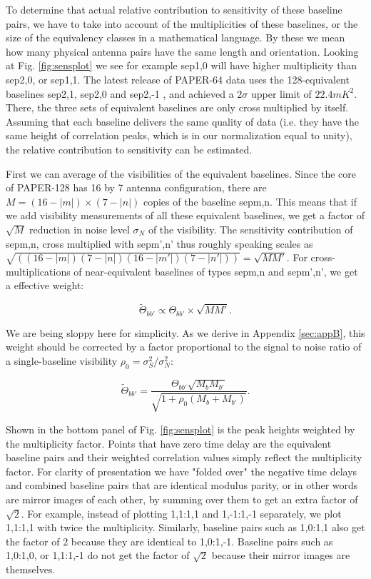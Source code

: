 \documentclass[preprint2,numberedappendix,tighten,twocolappendix]{aastex6}  %
\renewcommand\[{\begin{equation}}
\renewcommand\]{\end{equation}}
\begin{document}
To determine that actual relative contribution to sensitivity of these
baseline pairs, we have to take into account of the multiplicities of
these baselines, or the size of the equivalency classes in a mathematical
language. By these we mean how many physical antenna pairs have the
same length and orientation. Looking at Fig. \ref{fig:sensplot}
we see for example sep1,0 will have higher multiplicity than sep2,0,
or sep1,1. The latest release of PAPER-64 data uses the 128-equivalent baselines sep2,1,
sep2,0 and sep2,-1 \cite{Ali2015}, and achieved a $2\sigma$ upper
limit of $22.4mK^{2}$. There, the three sets of equivalent baselines
are only cross multiplied by itself. Assuming that each baseline delivers
the same quality of data (i.e. they have the same height of correlation
peaks, which is in our normalization equal to unity), the relative
contribution to sensitivity can be estimated. 

First we can average of the visibilities of the equivalent baselines. Since the core of PAPER-128 has 16 by 7 antenna configuration, there
are $M=(16-|m|)\times(7-|n|)$ copies of the baseline sepm,n. This means
that if we add visibility measurements of all these equivalent baselines,
we get a factor of $\sqrt{M}$ reduction in noise
level $\sigma_N$ of the visibility. The sensitivity contribution of sepm,n, cross multiplied with sepm',n'  thus roughly speaking scales as $\sqrt{\left((16-|m|)(7-|n|)(16-|m'|)(7-|n'|)\right)}=\sqrt{MM'}$.
For cross-multiplications of near-equivalent baselines of
types sepm,n and sepm',n', we get a effective weight: 

\begin{equation}
\widetilde{\Theta}_{bb'} \propto \Theta_{bb'}\times\sqrt{MM'}.\label{eq:sensul}
\end{equation}

We are being sloppy here for simplicity. As we derive in Appendix \ref{sec:appB}, this weight should be corrected by a factor proportional to the signal to noise ratio of a single-baseline visibility $\rho_0=\sigma_S^2/\sigma_N^2$:

\begin{equation}
\label{eq:tildereal}
\widetilde{\Theta}_{bb'}=\frac{\Theta_{bb'}\sqrt{M_bM_{b'}}}{\sqrt{1 + \rho_0 \left(M_b+M_{b'} \right)}}.
\end{equation}

Shown in the bottom panel of Fig. \eqref{fig:sensplot} is the peak heights weighted
by the multiplicity factor. Points that have zero time delay are the equivalent baseline pairs and their weighted correlation values simply reflect the multiplicity factor. For clarity of presentation we have "folded over" the negative time delays and combined baseline pairs that are identical modulus parity, 
or in other words are mirror images of each other, by summing over them to get an extra factor of $\sqrt{2}$. For example, 
instead of plotting 1,1:1,1 and 1,-1:1,-1 separately, we plot 1,1:1,1 with twice the multiplicity. Similarly, baseline pairs such as 
1,0:1,1 also get the factor of 2 because they are identical to 1,0:1,-1. Baseline pairs such as 1,0:1,0, or 1,1:1,-1 do not get
the factor of $\sqrt{2}$ because their mirror images are themselves. 
\end{document}
